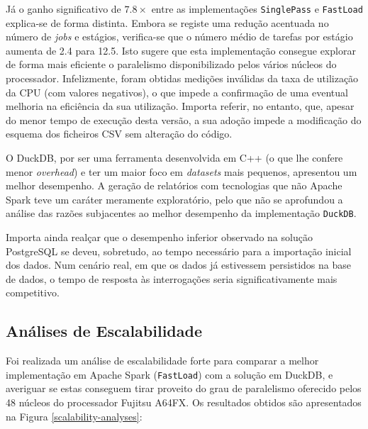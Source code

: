 \documentclass[11pt, a4paper]{article}
\begin{document}
Já o ganho significativo de $7.8\times$ entre as implementações \texttt{SinglePass} e
\texttt{FastLoad} explica-se de forma distinta. Embora se registe uma redução acentuada no número de
\emph{jobs} e estágios, verifica-se que o número médio de tarefas por estágio aumenta de 2.4 para
12.5. Isto sugere que esta implementação consegue explorar de forma mais eficiente o paralelismo
disponibilizado pelos vários núcleos do processador. Infelizmente, foram obtidas medições inválidas
da taxa de utilização da CPU (com valores negativos), o que impede a confirmação de uma eventual
melhoria na eficiência da sua utilização. Importa referir, no entanto, que, apesar do menor tempo de
execução desta versão, a sua adoção impede a modificação do esquema dos ficheiros CSV sem alteração
do código.

O DuckDB, por ser uma ferramenta desenvolvida em C++ (o que lhe confere menor \emph{overhead}) e ter
um maior foco em \emph{datasets} mais pequenos, apresentou um melhor desempenho. A geração de
relatórios com tecnologias que não Apache Spark teve um caráter meramente exploratório, pelo que não
se aprofundou a análise das razões subjacentes ao melhor desempenho da implementação
\texttt{DuckDB}.

Importa ainda realçar que o desempenho inferior observado na solução PostgreSQL se deveu, sobretudo,
ao tempo necessário para a importação inicial dos dados. Num cenário real, em que os dados já
estivessem persistidos na base de dados, o tempo de resposta às interrogações seria
significativamente mais competitivo.

\subsection{Análises de Escalabilidade}

Foi realizada um análise de escalabilidade forte para comparar a melhor implementação em Apache
Spark (\texttt{FastLoad}) com a solução em DuckDB, e averiguar se estas conseguem tirar proveito do
grau de paralelismo oferecido pelos 48 núcleos do processador Fujitsu A64FX. Os resultados obtidos
são apresentados na Figura \ref{scalability-analyses}:
\end{document}
